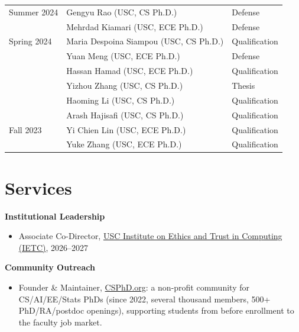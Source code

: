 \documentclass[margin,line,pifont,palatino,courier]{res}
\begin{document}
\begin{resume}
\begin{tabularx}{\textwidth}{@{}>{\raggedright\arraybackslash}p{0.95in}X>{\raggedright\arraybackslash}p{1.7in}@{}}
\addlinespace[0.15em]
Summer 2024 & Gengyu Rao (USC, CS Ph.D.) & Defense \\
\multicolumn{1}{@{}l}{ } & Mehrdad Kiamari (USC, ECE Ph.D.) & Defense \\
\addlinespace[0.15em]
Spring 2024 & Maria Despoina Siampou (USC, CS Ph.D.) & Qualification \\
\multicolumn{1}{@{}l}{ } & Yuan Meng (USC, ECE Ph.D.) & Defense \\
\multicolumn{1}{@{}l}{ } & Hassan Hamad (USC, ECE Ph.D.) & Qualification \\
\multicolumn{1}{@{}l}{ } & Yizhou Zhang (USC, CS Ph.D.) & Thesis \\
\multicolumn{1}{@{}l}{ } & Haoming Li (USC, CS Ph.D.) & Qualification \\
\multicolumn{1}{@{}l}{ } & Arash Hajisafi (USC, CS Ph.D.) & Qualification \\
\addlinespace[0.15em]
Fall 2023 & Yi Chien Lin (USC, ECE Ph.D.) & Qualification \\
\multicolumn{1}{@{}l}{ } & Yuke Zhang (USC, ECE Ph.D.) & Qualification \\
\bottomrule
\end{tabularx}


\section{\sc Services}

\textbf{Institutional Leadership}
\begin{itemize}[leftmargin=*]
\setlength\itemsep{-0.1em}
    \item Associate Co-Director, \href{https://sites.usc.edu/ietc/}{USC Institute on Ethics and Trust in Computing (IETC)}, 2026--2027
\end{itemize}

\textbf{Community Outreach}
\begin{itemize}[leftmargin=*]
\setlength\itemsep{-0.1em}
    \item Founder \& Maintainer, \href{https://csphd.org}{CSPhD.org}: a non-profit community for CS/AI/EE/Stats PhDs (since 2022, several thousand members, 500+ PhD/RA/postdoc openings), supporting students from before enrollment to the faculty job market.
\end{itemize}


\end{resume}
\end{document}
